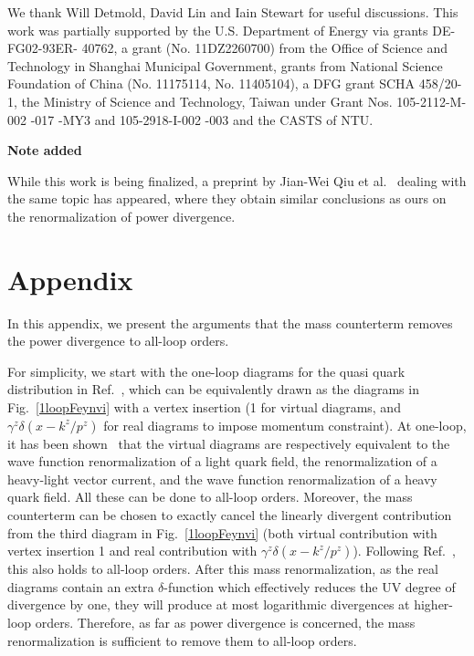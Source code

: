 \vspace{1em}
We thank Will Detmold, David Lin and Iain Stewart for useful discussions. This work was partially supported by the U.S. Department of Energy via grants DE-FG02-93ER-
40762, a grant (No. 11DZ2260700) from the Office of Science and Technology in Shanghai Municipal Government,
grants from National Science Foundation of China (No. 11175114, No. 11405104), a DFG grant SCHA 458/20-1, the
Ministry of Science and Technology, Taiwan under Grant Nos. 105-2112-M-002 -017 -MY3 and 105-2918-I-002 -003
and the CASTS of NTU.

\vspace{2em}
\begin{center}
\bf{Note added}
\end{center}

While this work is being finalized, a preprint by Jian-Wei Qiu et al.~\cite{Ishikawa:2016znu} dealing with the same topic has appeared, where they obtain similar conclusions as ours on the renormalization of power divergence. 

\appendix

\section{Appendix}
In this appendix, we present the arguments that the mass counterterm removes the power divergence to all-loop orders.

For simplicity, we start with the one-loop diagrams for the quasi quark distribution in Ref.~\cite{Ji:2015jwa}, %
which can be equivalently drawn as the diagrams in Fig.~\ref{1loopFeynvi} with a vertex insertion (1 for virtual diagrams, and $\gamma^z\delta(x-k^z/p^z)$ for real diagrams to impose momentum constraint). At one-loop, it has been shown~\cite{Ji:2015jwa} that the virtual diagrams are respectively equivalent to the wave function renormalization of a light quark field, the renormalization of a heavy-light vector current, and the wave function renormalization of a heavy quark field. All these can be done to all-loop orders. Moreover, the mass counterterm can be chosen to exactly cancel the linearly divergent contribution from the third diagram in Fig.~\ref{1loopFeynvi} (both virtual contribution with vertex insertion 1 and real contribution with $\gamma^z\delta(x-k^z/p^z)$). Following Ref.~\cite{Dorn:1986dt}, this also holds to all-loop orders. After this mass renormalization, as the real diagrams contain an extra $\delta$-function which effectively reduces the UV degree of divergence by one, they will produce at most logarithmic divergences at higher-loop orders. Therefore, as far as power divergence is concerned, the mass renormalization is sufficient to remove them to all-loop orders.

